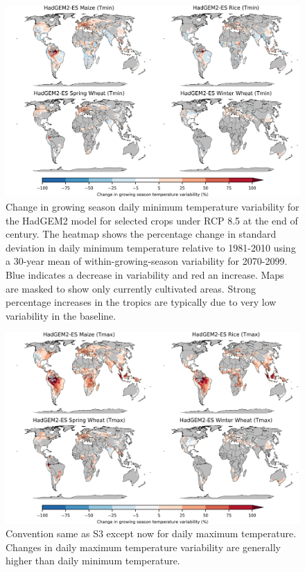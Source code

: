 \documentclass[12pt]{article}
\begin{document}
\begin{figure}[h!]
  \centering
  \includegraphics[width = 14cm]{HadGEM2-ES_var_change_min.png}
  \caption{
    Change in growing season daily minimum temperature variability for the HadGEM2 model for selected crops under RCP 8.5 at the end of century. 
    The heatmap shows the percentage change in standard deviation in daily minimum temperature relative to 1981-2010 using a 30-year mean of within-growing-season variability for 2070-2099.
    Blue indicates a decrease in variability and red an increase.
    Maps are masked to show only currently cultivated areas.
    Strong percentage increases in the tropics are typically due to very low variability in the baseline.
  }
  \label{fig:var}
\end{figure}

\begin{figure}[h!]
  \centering
  \includegraphics[width = 14cm]{HadGEM2-ES_var_change_max.png}
  \caption{
  Convention same as S3 except now for daily maximum temperature. Changes in daily maximum temperature variability are generally higher than daily minimum temperature.
  }
  \label{fig:var}
\end{figure}
\end{document}
